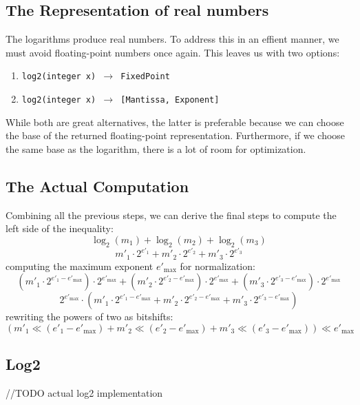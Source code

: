 \documentclass[11pt]{article}
\begin{document}
\subsection{The Representation of real numbers}
The logarithms produce real numbers. To address this in an effient manner, we must avoid floating-point numbers once again. This leaves us with two options:
\begin{enumerate}
  \item \texttt{log2(integer x) $\rightarrow$ FixedPoint}
  \item \texttt{log2(integer x) $\rightarrow$ [Mantissa, Exponent]}
\end{enumerate}
While both are great alternatives, the latter is preferable because we can choose the base of the returned floating-point representation. Furthermore, if we choose the same base as the logarithm, there is a lot of room for optimization.

\subsection{The Actual Computation}
Combining all the previous steps, we can derive the final steps to compute the left side of the inequality:
\setcounter{equation}{0}
\begin{equation}
    \log_2(m_1) + \log_2(m_2) + \log_2(m_3)
\end{equation}
\begin{equation}
    m'_1 \cdot 2^{e'_1} + m'_2 \cdot 2^{e'_2} + m'_3 \cdot 2^{e'_3}
\end{equation}
computing the maximum exponent $e'_{\max}$ for normalization:
\begin{equation}
    (m'_1 \cdot 2^{e'_1 - e'_{\max}}) \cdot 2^{e'_{\max}} + (m'_2 \cdot 2^{e'_2 - e'_{\max}}) \cdot 2^{e'_{\max}} + (m'_3 \cdot 2^{e'_3 - e'_{\max}}) \cdot 2^{e'_{\max}}
\end{equation} 
\begin{equation}
    2^{e'_{\max}} \cdot (m'_1 \cdot 2^{e'_1 - e'_{\max}} + m'_2 \cdot 2^{e'_2 - e'_{\max}} + m'_3 \cdot 2^{e'_3 - e'_{\max}})
\end{equation}
rewriting the powers of two as bitshifts:
\begin{equation}
    (m'_1 \ll (e'_1 - e'_{\max}) + m'_2 \ll (e'_2 - e'_{\max}) + m'_3 \ll (e'_3 - e'_{\max})) \ll e'_{\max}
\end{equation}


\subsection{Log2}
//TODO actual log2 implementation
\end{document}
